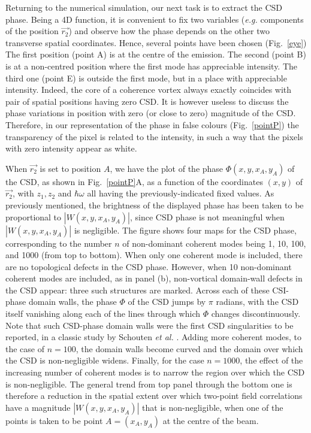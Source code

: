 \documentclass{iucr}              %
\newcommand{\inblue}[1]{{\color{blue}#1}}
\begin{document}
Returning to the numerical simulation, our next task is to extract the CSD phase. Being a 4D function, it is convenient to fix two variables ({\em e.g.} components of the position $\vec{r_2}$) and observe how the phase depends on the other two transverse spatial coordinates. Hence, several points have been chosen (\inblue{Fig.~\ref{eye}}) The first position (point A) is at the centre of the emission. The second (point B) is at a non-centred position where the first mode has appreciable intensity. The third one (point E) is outside the first mode, but in a place with appreciable intensity. Indeed, the core of a coherence vortex always exactly coincides with pair of spatial positions having zero CSD. It is however useless to discuss the phase variations in position with zero (or close to zero) magnitude of the CSD. Therefore, in our representation of the phase in false colours (\inblue{Fig.~\ref{pointP}}) the transparency of the pixel is related to the intensity, in such a way that the pixels with zero intensity appear as white. 

When $\vec{r_2}$ is set to position $A$, we have the plot of the phase $\Phi(x,y,x_A,y_A)$ of the CSD, as shown in \inblue{Fig.~\ref{pointP}A}, as a function of the coordinates $(x,y)$ of $\vec{r_2}$, with $z_1, z_2$ and $\hbar\omega$ all having the previously-indicated fixed values.  As previously mentioned, the brightness of the displayed phase has been taken to be proportional to $|W(x,y,x_A,y_A)|$, since CSD phase is not meaningful when $|W(x,y,x_A,y_A)|$ is negligible.  The figure shows four maps for the CSD phase, corresponding to the number $n$ of non-dominant coherent modes being 1, 10, 100, and 1000 (from top to bottom).  When only one coherent mode is included, there are no topological defects in the CSD phase.  However, when 10 non-dominant coherent modes are included, as in panel (b), non-vortical domain-wall defects in the CSD appear: three such structures are marked.  Across each of these CSI-phase domain walls, the phase $\Phi$ of the CSD jumps by $\pi$ radians, with the CSD itself vanishing along each of the lines through which $\Phi$ changes discontinuously.  Note that such CSD-phase domain walls were the first CSD singularities to be reported, in a classic study by Schouten {\em et al.} \citeyear{Schouten2003}.  Adding more coherent modes, to the case of $n=100$, the domain walls become curved and the domain over which the CSD is non-negligible widens.  Finally, for the case  $n=1000$, the effect of the increasing number of coherent modes is to narrow the region over which the CSD is non-negligible.  The general trend from top panel through the bottom one is therefore a reduction in the spatial extent over which two-point field correlations have a magnitude $|W(x,y,x_A,y_A)|$ that is non-negligible, when one of the points is taken to be point $A=(x_A,y_A)$ at the centre of the beam.           
\end{document}
